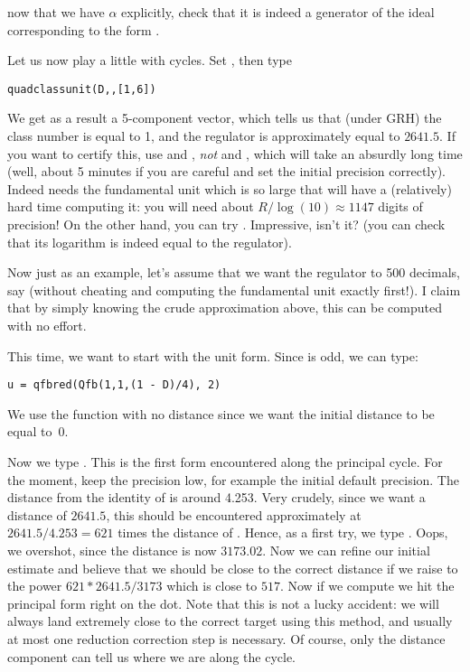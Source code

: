  now that we have $\alpha$ explicitly, check that it
is indeed a generator of the ideal corresponding to the form .

\medskip Let us now play a little with cycles. Set ,
then type

\centerline{\tt quadclassunit(D,,[1,6])}

We get as a result a 5-component vector, which tells us that (under GRH) the
class number is equal to 1, and the regulator is approximately
equal to $2641.5$. If you want to certify this, use  and
, \emph{not}  and , which will
take an absurdly long time (well, about 5 minutes if you are careful and set
the initial precision correctly). Indeed  needs the fundamental
unit which is so large that  will have a (relatively) hard time
computing it: you will need about $R/\log(10)\approx 1147$ digits of precision!
On the other hand, you can try . Impressive, isn't it? (you
can check that its logarithm is indeed equal to the regulator).

Now just as an example, let's assume that we want the regulator to 500
decimals, say (without cheating and computing the fundamental unit exactly
first!). I claim that by simply knowing the crude approximation above, this
can be computed with no effort.

This time, we want to start with the unit form. Since  is odd, we can
type:

\centerline{\tt u = qfbred(Qfb(1,1,(1 - D)/4), 2)}

We use the function  with no distance since we want the initial
distance to be equal to~0.

Now we type  . This is the first form encountered along
the principal cycle. For the moment, keep the precision low, for example the
initial default precision. The distance from the identity of  is
around 4.253. Very crudely, since we want a distance of $2641.5$, this should
be encountered approximately at $2641.5/4.253=621$ times the distance of
. Hence, as a first try, we type . Oops, we overshot,
since the distance is now $3173.02$. Now we can refine our initial estimate and
believe that we should be close to the correct distance if we raise  to
the power $621*2641.5/3173$ which is close to $517$. Now if we compute
 we hit the principal form right on the dot. Note that this is
not a lucky accident: we will always land extremely close to the correct target
using this method, and usually at most one reduction correction step is
necessary. Of course, only the distance component can tell us where we are
along the cycle.

